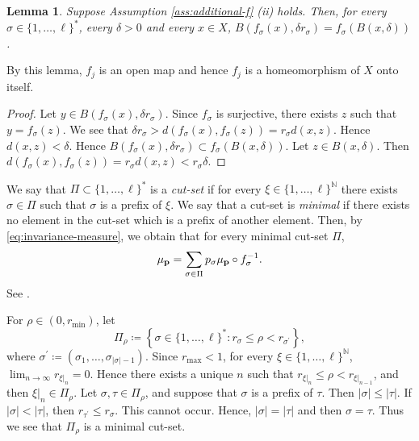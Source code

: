 \documentclass[a4paper, reqno, 11pt]{amsart}
\newtheorem{Lem}[Thm]{Lemma}
\theoremstyle{definition}
\begin{document}
\begin{Lem}\label{lem:ball-surjection}
Suppose Assumption \ref{ass:additional-f} (ii) holds. 
Then, for every $\sigma \in \{1,\dots, \ell\}^*$, every $\delta > 0$ and every $x \in X$, 
$B(f_{\sigma}(x), \delta r_{\sigma}) = f_{\sigma}(B(x,\delta))$. 
\end{Lem}

By this lemma, $f_j$ is an open map and hence $f_j$ is a homeomorphism of $X$ onto itself. 

\begin{proof}
Let $y \in B(f_{\sigma}(x), \delta r_{\sigma})$. 
Since $f_{\sigma}$ is surjective, 
there exists $z$ such that $y = f_{\sigma}(z)$. 
We see that $\delta r_{\sigma} > d(f_{\sigma}(x), f_{\sigma}(z)) = r_{\sigma} d(x,z)$.
Hence $d(x,z) < \delta$. 
Hence $B(f_{\sigma}(x), \delta r_{\sigma}) \subset f_{\sigma}(B(x,\delta))$. 
Let $z \in B(x,\delta)$. 
Then $d(f_{\sigma}(x), f_{\sigma}(z)) = r_{\sigma} d(x,z) < r_{\sigma} \delta$. 
\end{proof}


We say that $\Pi \subset \{1,\dots, \ell\}^{*}$ is a {\it cut-set} if for every $\xi \in \{1,\dots, \ell\}^{\mathbb N}$ there exists $\sigma \in \Pi$ such that $\sigma$ is a prefix of $\xi$. 
We say that a cut-set is {\it minimal} if there exists no element in the cut-set which is a prefix of another element. 
Then, by \eqref{eq:invariance-measure}, 
we obtain that for every minimal cut-set $\Pi$, 
\begin{equation}\label{eq:invariance-min-cutset}
\mu_{\bf p} = \sum_{\sigma \in \Pi} p_{\sigma} \mu_{\bf p} \circ f_{\sigma}^{-1}.
\end{equation}
See \cite[Lemma 2.2.4 (ii)]{BishopPeres2017}. 

For $\rho \in (0, r_{\min})$, 
let 
\begin{equation}\label{eq:def-cutset-1} 
\Pi_{\rho} \coloneqq \left\{\sigma \in \{1,\dots, \ell\}^{*} \colon r_{\sigma} \le \rho < r_{\sigma^{\prime}} \right\}, 
\end{equation}
where $\sigma^{\prime} \coloneqq (\sigma_1, \dots, \sigma_{|\sigma|-1})$. 
Since $r_{\max} < 1$, for every $\xi \in \{1,\dots, \ell\}^{\mathbb N}$, 
$\lim_{n \to \infty} r_{\xi|_n} = 0$. 
Hence there exists a unique $n$ such that $r_{\xi|_n} \le \rho < r_{\xi|_{n-1}}$, and then $\xi|_n \in \Pi_{\rho}$. 
Let $\sigma, \tau \in \Pi_{\rho}$, and suppose that $\sigma$ is a prefix of $\tau$. 
Then $|\sigma| \le |\tau|$. 
If $|\sigma| < |\tau|$, then $r_{\tau^{\prime}} \le r_{\sigma}$. 
This cannot occur. 
Hence, $|\sigma| = |\tau|$ and then $\sigma = \tau$. 
Thus we see that $\Pi_{\rho}$ is a minimal cut-set. 
\end{document}
